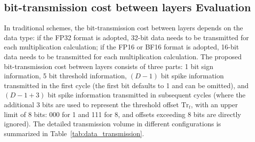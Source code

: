\begin{table}[htbp]
    \centering
    \caption{Total Energy Consumption and Energy Ratio for Different $(T,\,D)$ Configurations (Unit: pJ)}
    \label{tab:power_consumption_fp16}
    \vspace{0.8em}
\end{table}
 
\subsection{ bit-transmission cost between layers Evaluation}
 In traditional schemes, the  bit-transmission cost between layers depends on the data type: if the FP32 format is adopted, 32-bit data needs to be transmitted for each multiplication calculation; if the FP16 or BF16 format is adopted, 16-bit data needs to be transmitted for each multiplication calculation.
 The proposed  bit-transmission cost between layers consists of three parts: 1 bit sign information, 5 bit threshold information, $(D-1)$ bit spike information transmitted in the first cycle (the first bit defaults to 1 and can be omitted), and $(D-1+3)$ bit spike information transmitted in subsequent cycles (where the additional 3 bits are used to represent the threshold offset $\mathrm{Tr}_t$, with an upper limit of 8 bits: 000 for 1 and 111 for 8, and offsets exceeding 8 bits are directly ignored). The detailed transmission volume in different configurations is summarized in Table~\ref{tab:data_transmission}.

